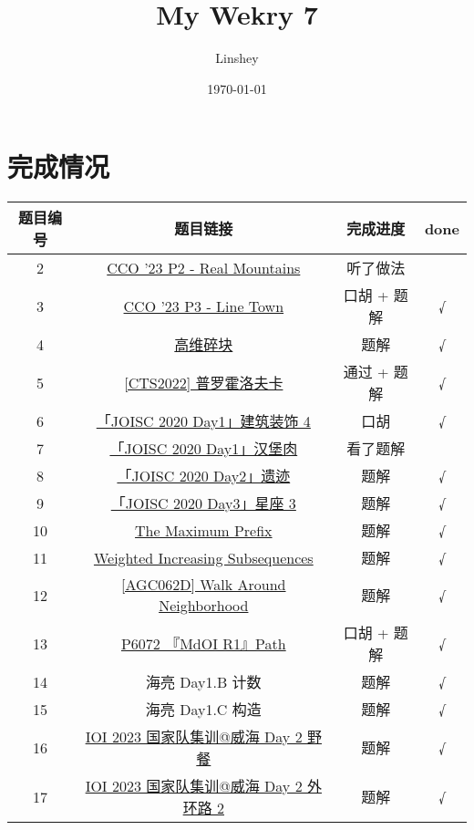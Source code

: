 \documentclass[12pt, a4paper, oneside]{ctexart}
\title{\textbf{My Wekry 7}}
\author{Linshey}
\date{\today}
\begin{document}
\maketitle
\setcounter{page}{1}
\thispagestyle{empty}

\newpage
{}
\setcounter{page}{1}
\tableofcontents

\newpage
\setcounter{page}{1}

\section{完成情况}

\begin{table}[h!]
\centering
\begin{tabular}{cccc}
    题目编号 & 题目链接 & 完成进度 & done\\\hline
    2 & \href{https://dmoj.ca/problem/cco23p2}{CCO '23 P2 - Real Mountains} & 听了做法 & \\
    3 & \href{https://dmoj.ca/problem/cco23p2}{CCO '23 P3 - Line Town
    } & 口胡 + 题解 & √ \\
    4 & \href{http://www.nfls.com.cn:10611/contest/889/problem/3}{高维碎块} & 题解 & √ \\
    5 & \href{https://www.luogu.com.cn/problem/P8257}{[CTS2022] 普罗霍洛夫卡} & 通过 + 题解 & √ \\
    6 & \href{https://loj.ac/p/3271}{「JOISC 2020 Day1」建筑装饰 4} & 口胡 & √ \\
    7 & \href{https://loj.ac/p/3272}{「JOISC 2020 Day1」汉堡肉} & 看了题解 & \\
    8 & \href{https://loj.ac/p/3276}{「JOISC 2020 Day2」遗迹} & 题解 & √ \\
    9 & \href{https://loj.ac/p/3277}{「JOISC 2020 Day3」星座 3} & 题解 & √ \\
    10 & \href{https://www.luogu.com.cn/problem/CF1810G}{The Maximum Prefix} & 题解 & √ \\
    11 & \href{https://www.luogu.com.cn/problem/CF1621G}{Weighted Increasing Subsequences} & 题解 & √ \\
    12 & \href{https://www.luogu.com.cn/problem/AT_agc062_d}{[AGC062D] Walk Around Neighborhood} & 题解 & √ \\
    13 & \href{https://www.luogu.com.cn/problem/P6072}{P6072 『MdOI R1』Path} & 口胡 + 题解 & √ \\
    14 & 海亮 Day1.B 计数 & 题解 & √ \\
    15 & 海亮 Day1.C 构造 & 题解 & √ \\
    16 & \href{https://qoj.ac/contest/1268/problem/6661}{IOI 2023 国家队集训@威海 Day 2 野餐} & 题解 & √ \\
    17 & \href{https://qoj.ac/contest/1268/problem/6659}{IOI 2023 国家队集训@威海 Day 2 外环路 2} & 题解 & √
\end{tabular}
\end{table}
\end{document}
